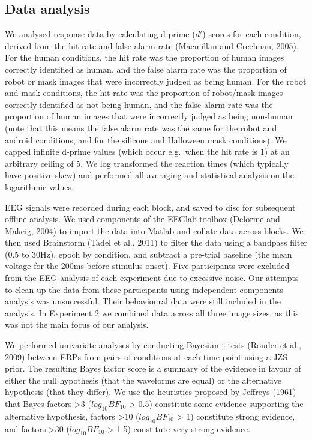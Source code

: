 \documentclass[
]{article}
\begin{document}
\hypertarget{data-analysis}{%
\subsection{Data analysis}\label{data-analysis}}

We analysed response data by calculating d-prime (\(d'\)) scores for each condition, derived from the hit rate and false alarm rate (Macmillan and Creelman, 2005). For the human conditions, the hit rate was the proportion of human images correctly identified as human, and the false alarm rate was the proportion of robot or mask images that were incorrectly judged as being human. For the robot and mask conditions, the hit rate was the proportion of robot/mask images correctly identified as not being human, and the false alarm rate was the proportion of human images that were incorrectly judged as being non-human (note that this means the false alarm rate was the same for the robot and android conditions, and for the silicone and Halloween mask conditions). We capped infinite d-prime values (which occur e.g.~when the hit rate is 1) at an arbitrary ceiling of 5. We log transformed the reaction times (which typically have positive skew) and performed all averaging and statistical analysis on the logarithmic values.

EEG signals were recorded during each block, and saved to disc for subsequent offline analysis. We used components of the EEGlab toolbox (Delorme and Makeig, 2004) to import the data into Matlab and collate data across blocks. We then used Brainstorm (Tadel et al., 2011) to filter the data using a bandpass filter (0.5 to 30Hz), epoch by condition, and subtract a pre-trial baseline (the mean voltage for the 200ms before stimulus onset). Five participants were excluded from the EEG analysis of each experiment due to excessive noise. Our attempts to clean up the data from these participants using independent components analysis was unsuccessful. Their behavioural data were still included in the analysis. In Experiment 2 we combined data across all three image sizes, as this was not the main focus of our analysis.

We performed univariate analyses by conducting Bayesian t-tests (Rouder et al., 2009) between ERPs from pairs of conditions at each time point using a JZS prior. The resulting Bayes factor score is a summary of the evidence in favour of either the null hypothesis (that the waveforms are equal) or the alternative hypothesis (that they differ). We use the heuristics proposed by Jeffreys (1961) that Bayes factors \textgreater3 (\(log_{10}BF_{10}\) \textgreater{} 0.5) constitute some evidence supporting the alternative hypothesis, factors \textgreater10 (\(log_{10}BF_{10}\) \textgreater{} 1) constitute strong evidence, and factors \textgreater30 (\(log_{10}BF_{10}\) \textgreater{} 1.5) constitute very strong evidence.
\end{document}
